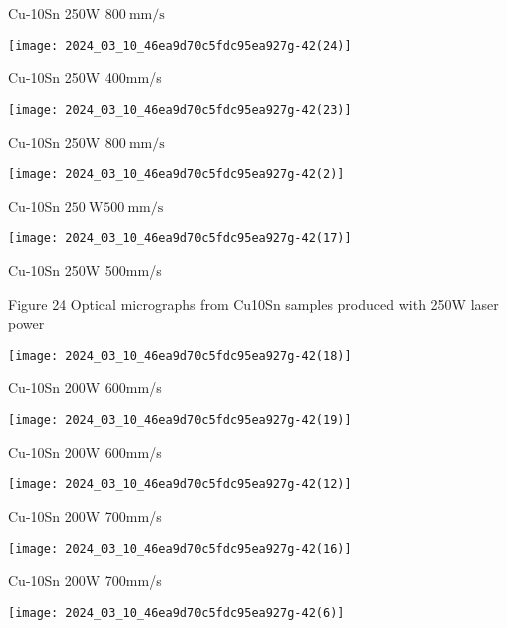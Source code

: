 \documentclass[10pt]{article}
\begin{document}
Cu-10Sn 250W $800 \mathrm{~mm} / \mathrm{s}$

\begin{center}
\texttt{[image: 2024\_03\_10\_46ea9d70c5fdc95ea927g-42(24)]}
\end{center}

Cu-10Sn 250W 400mm/s

\begin{center}
\texttt{[image: 2024\_03\_10\_46ea9d70c5fdc95ea927g-42(23)]}
\end{center}

Cu-10Sn 250W $800 \mathrm{~mm} / \mathrm{s}$

\begin{center}
\texttt{[image: 2024\_03\_10\_46ea9d70c5fdc95ea927g-42(2)]}
\end{center}

Cu-10Sn $250 \mathrm{~W} 500 \mathrm{~mm} / \mathrm{s}$

\begin{center}
\texttt{[image: 2024\_03\_10\_46ea9d70c5fdc95ea927g-42(17)]}
\end{center}

Cu-10Sn 250W 500mm/s

Figure 24 Optical micrographs from Cu10Sn samples produced with 250W laser power

\begin{center}
\texttt{[image: 2024\_03\_10\_46ea9d70c5fdc95ea927g-42(18)]}
\end{center}

Cu-10Sn 200W 600mm/s

\begin{center}
\texttt{[image: 2024\_03\_10\_46ea9d70c5fdc95ea927g-42(19)]}
\end{center}

Cu-10Sn 200W 600mm/s

\begin{center}
\texttt{[image: 2024\_03\_10\_46ea9d70c5fdc95ea927g-42(12)]}
\end{center}

Cu-10Sn 200W 700mm/s

\begin{center}
\texttt{[image: 2024\_03\_10\_46ea9d70c5fdc95ea927g-42(16)]}
\end{center}

Cu-10Sn 200W 700mm/s

\begin{center}
\texttt{[image: 2024\_03\_10\_46ea9d70c5fdc95ea927g-42(6)]}
\end{center}
\end{document}
